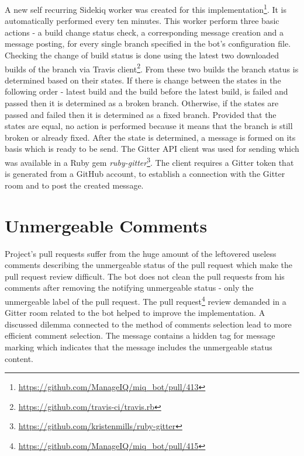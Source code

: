 A new self recurring Sidekiq worker was created for this implementation\footnote{\url{https://github.com/ManageIQ/miq_bot/pull/413}}. It is automatically performed every ten minutes. This worker perform three basic actions - a build change status check, a corresponding message creation and a message posting, for every single branch specified in the bot's configuration file. Checking the change of build status is done using the latest two downloaded builds of the branch via Travis client\footnote{\url{https://github.com/travis-ci/travis.rb}}. From these two builds the branch status is determined based on their states. If there is change between the states in the following order - latest build and the build before the latest build, is failed and passed then it is determined as a broken branch. Otherwise, if the states are passed and failed then it is determined as a fixed branch. Provided that the states are equal, no action is performed because it means that the branch is still broken or already fixed. After the state is determined, a message is formed on its basis which is ready to be send. The Gitter API client was used for sending which was available in a Ruby gem \textit{ruby-gitter}\footnote{\url{https://github.com/kristenmills/ruby-gitter}}. The client requires a Gitter token that is generated from a GitHub account, to establish a connection with the Gitter room and to post the created message.

\section{Unmergeable Comments}

Project's pull requests suffer from the huge amount of the leftovered useless comments describing the unmergeable status of the pull request which make the pull request review difficult. The bot does not clean the pull requests from his comments after removing the notifying unmergeable status - only the unmergeable label of the pull request. The pull request\footnote{\url{https://github.com/ManageIQ/miq_bot/pull/415}} review demanded in a Gitter room related to the bot helped to improve the implementation. A discussed dilemma connected to the method of comments selection lead to more efficient comment selection. The message contains a hidden tag for message marking which indicates that the message includes the unmergeable status content.\\

